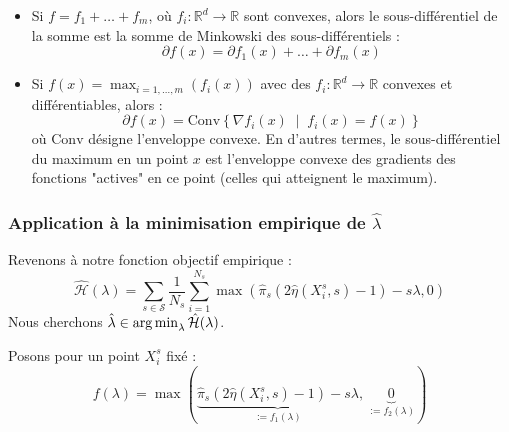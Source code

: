 \begin{itemize}
    \item Si $f = f_1 + \dots + f_m$, où $f_i : \mathbb{R}^d \to \mathbb{R}$ sont convexes, alors le sous-différentiel de la somme est la somme de Minkowski des sous-différentiels :
    \begin{equation}
        \partial f(x) = \partial f_1(x) + \dots + \partial f_m(x)
    \end{equation}
    
    \item Si $f(x) = \max_{i=1, \dots, m} (f_i(x))$ avec des $f_i : \mathbb{R}^d \to \mathbb{R}$ convexes et différentiables, alors :
    \begin{equation}
        \partial f(x) = \text{Conv} \left\{ \nabla f_i(x) \;\middle|\; f_i(x) = f(x) \right\}
    \end{equation}
    où $\text{Conv}$ désigne l'enveloppe convexe. En d'autres termes, le sous-différentiel du maximum en un point $x$ est l'enveloppe convexe des gradients des fonctions "actives" en ce point (celles qui atteignent le maximum).
\end{itemize}

\subsubsection{Application à la minimisation empirique de $\hat{\lambda}$}

Revenons à notre fonction objectif empirique :
\begin{equation}
    \hat{\mathcal{H}}(\lambda) = \sum_{s \in \mathcal{S}} \frac{1}{N_s} \sum_{i=1}^{N_s} \max \left( \hat{\pi}_s (2\hat{\eta}(X_i^s, s) - 1) - s\lambda, 0 \right)
\end{equation}
Nous cherchons $\hat{\lambda} \in \operatorname*{arg\,min}_{\lambda} \hat{\mathcal{H}}(\lambda)$.

Posons pour un point $X_i^s$ fixé :
\begin{equation*}
    f(\lambda) = \max \left( \underbrace{\hat{\pi}_s (2\hat{\eta}(X_i^s, s) - 1) - s\lambda}_{:= f_1(\lambda)}, \, \underbrace{0}_{:= f_2(\lambda)} \right)
\end{equation*}

